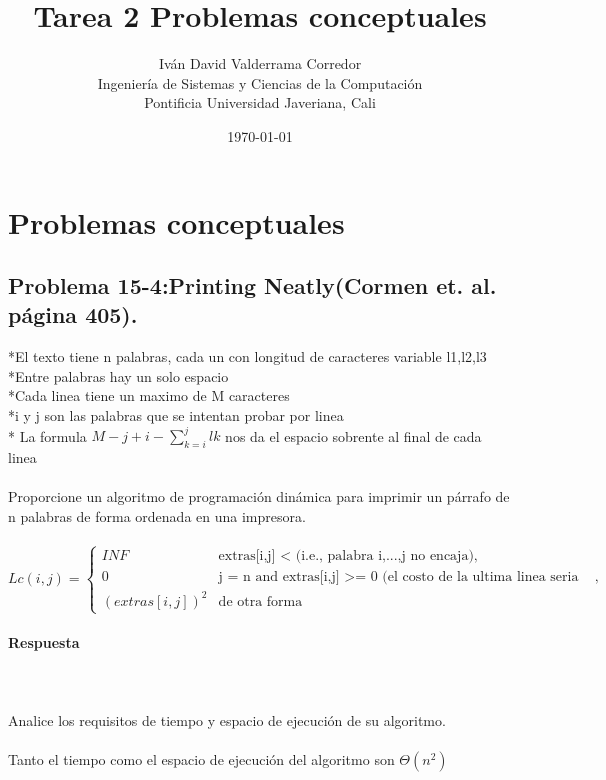 \documentclass[a4paper,12pt]{article}
\title{Tarea 2 Problemas conceptuales}
\author{%
  Iván David Valderrama Corredor\\ %
  Ingeniería de Sistemas y Ciencias de la Computación\\ %
  Pontificia Universidad Javeriana, Cali}
\date{\today}
\newcommand{\subfigureautorefname}{\figureautorefname}
\begin{document}
	
\renewcommand{\tablename}{\bfseries Tabla} %
\renewcommand{\figurename}{\bfseries Figura} %
%
\maketitle

\tableofcontents

\newpage


\section{Problemas conceptuales}

\subsection{Problema 15-4:Printing Neatly(Cormen et. al. página 405).}
*El texto tiene n palabras, cada un con longitud de caracteres variable l1,l2,l3\\
*Entre palabras hay un solo espacio\\
*Cada linea tiene un maximo de M caracteres\\
*i y j son las palabras que se intentan probar por linea\\
* La formula $M - j + i - \sum_{k=i}^{j}lk$ nos da el espacio sobrente al final de cada linea\\
\\
Proporcione un algoritmo de programación dinámica para imprimir un párrafo de n palabras de forma ordenada en una impresora.\\\\
$Lc(i,j) = \left \{ \begin{matrix} INF & \mbox{extras[i,j] < (i.e., palabra i,...,j no encaja)},
\\ 0 &  \mbox{j = n and extras[i,j] >= 0 (el costo de la ultima linea seria 0)},
\\(extras[i,j])^2 &  \mbox{de otra forma}
\end{matrix}\right.$\\\\
\textbf{Respuesta}\\\\

\cite{CLRS}\cite{Tushar}\\\\
Analice los requisitos de tiempo y espacio de ejecución de su algoritmo.\\\\
Tanto el tiempo como el espacio de ejecución del algoritmo son $\Theta(n^2)$
\end{document}
